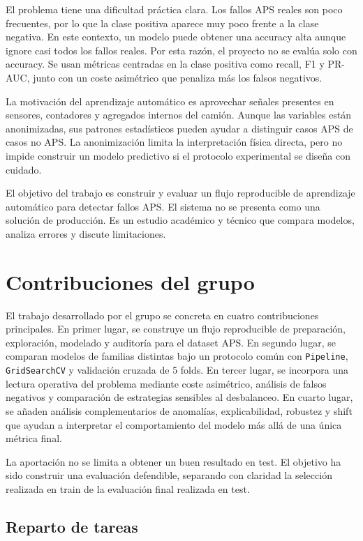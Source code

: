 \documentclass[11pt,a4paper]{article}
\begin{document}
El problema tiene una dificultad práctica clara. Los fallos APS reales son poco frecuentes, por lo que la clase positiva aparece muy poco frente a la clase negativa. En este contexto, un modelo puede obtener una accuracy alta aunque ignore casi todos los fallos reales. Por esta razón, el proyecto no se evalúa solo con accuracy. Se usan métricas centradas en la clase positiva como recall, F1 y PR-AUC, junto con un coste asimétrico que penaliza más los falsos negativos.

La motivación del aprendizaje automático es aprovechar señales presentes en sensores, contadores y agregados internos del camión. Aunque las variables están anonimizadas, sus patrones estadísticos pueden ayudar a distinguir casos APS de casos no APS. La anonimización limita la interpretación física directa, pero no impide construir un modelo predictivo si el protocolo experimental se diseña con cuidado.

El objetivo del trabajo es construir y evaluar un flujo reproducible de aprendizaje automático para detectar fallos APS. El sistema no se presenta como una solución de producción. Es un estudio académico y técnico que compara modelos, analiza errores y discute limitaciones.

\section{Contribuciones del grupo}
\label{sec_contribuciones}

El trabajo desarrollado por el grupo se concreta en cuatro contribuciones principales. En primer lugar, se construye un flujo reproducible de preparación, exploración, modelado y auditoría para el dataset APS. En segundo lugar, se comparan modelos de familias distintas bajo un protocolo común con \texttt{Pipeline}, \texttt{GridSearchCV} y validación cruzada de 5 folds. En tercer lugar, se incorpora una lectura operativa del problema mediante coste asimétrico, análisis de falsos negativos y comparación de estrategias sensibles al desbalanceo. En cuarto lugar, se añaden análisis complementarios de anomalías, explicabilidad, robustez y shift que ayudan a interpretar el comportamiento del modelo más allá de una única métrica final.

La aportación no se limita a obtener un buen resultado en test. El objetivo ha sido construir una evaluación defendible, separando con claridad la selección realizada en train de la evaluación final realizada en test.

\subsection{Reparto de tareas}
\end{document}
